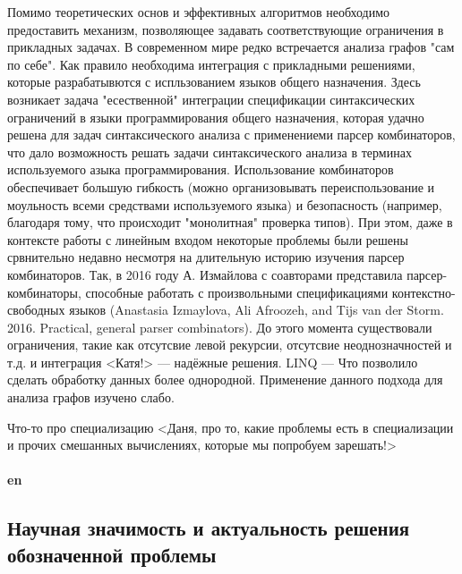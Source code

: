 \documentclass[12pt]{article}  %
\theoremstyle{remark}
\begin{document}
Помимо теоретических основ и эффективных алгоритмов необходимо предоставить механизм, позволяющее задавать соответствующие ограничения в прикладных задачах. В современном мире редко встречается анализа графов "сам по себе". Как правило необходима интеграция с прикладными решениями, которые разрабатывются с испльзованием языков общего назначения. Здесь возникает задача "есественной" интеграции спецификации синтаксических ограничений в языки программирования общего назначения, которая удачно решена для задач синтаксического анализа с применениеми парсер комбинаторов, что дало возможность решать задачи синтаксического анализа в терминах используемого азыка программирования. Использование комбинаторов обеспечивает большую гибкость (можно организовывать переиспользование и моульность всеми средствами используемого языка) и безопасность (например, благодаря тому, что происходит "монолитная" проверка типов). При этом, даже в контексте работы с линейным входом некоторые проблемы были решены срвнительно недавно несмотря на длительную историю изучения парсер комбинаторов. Так, в 2016 году А. Измайлова с соавторами представила парсер-комбинаторы, способные работать с произвольными спецификациями контекстно-свободных языков (Anastasia Izmaylova, Ali Afroozeh, and Tijs van der Storm. 2016. Practical, general parser combinators). До этого момента существовали ограничения, такие как отсутсвие левой рекурсии, отсутсвие неоднозначностей и т.д. и интеграция {\huge<Катя!>} --- надёжные решения. LINQ --- Что позволило сделать обработку данных более однородной. Применение данного подхода для анализа графов изучено слабо.

Что-то про специализацию {\huge<Даня, про то, какие проблемы есть в специализации и прочих смешанных вычислениях, которые мы попробуем зарешать!>}
\\
\\
\textbf{en}\\

\subsection{Научная значимость и актуальность решения обозначенной проблемы}
\end{document}
